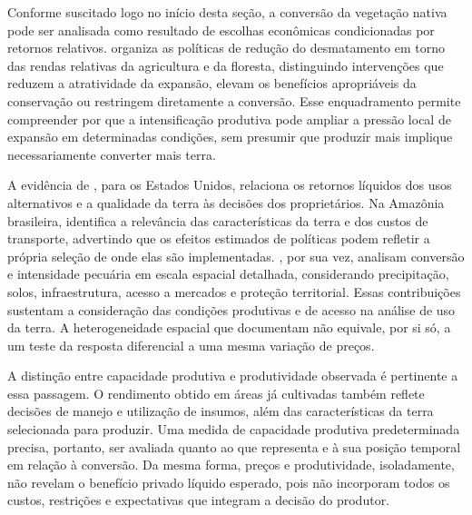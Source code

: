 Conforme suscitado logo no início desta seção, a conversão da vegetação nativa pode ser analisada como resultado de escolhas econômicas condicionadas por retornos relativos.  organiza as políticas de redução do desmatamento em torno das rendas relativas da agricultura e da floresta, distinguindo intervenções que reduzem a atratividade da expansão, elevam os benefícios apropriáveis da conservação ou restringem diretamente a conversão. Esse enquadramento permite compreender por que a intensificação produtiva pode ampliar a pressão local de expansão em determinadas condições, sem presumir que produzir mais implique necessariamente converter mais terra.

A evidência de , para os Estados Unidos, relaciona os retornos líquidos dos usos alternativos e a qualidade da terra às decisões dos proprietários. Na Amazônia brasileira,  identifica a relevância das características da terra e dos custos de transporte, advertindo que os efeitos estimados de políticas podem refletir a própria seleção de onde elas são implementadas. , por sua vez, analisam conversão e intensidade pecuária em escala espacial detalhada, considerando precipitação, solos, infraestrutura, acesso a mercados e proteção territorial. Essas contribuições sustentam a consideração das condições produtivas e de acesso na análise de uso da terra. A heterogeneidade espacial que documentam não equivale, por si só, a um teste da resposta diferencial a uma mesma variação de preços.

A distinção entre capacidade produtiva e produtividade observada é pertinente a essa passagem. O rendimento obtido em áreas já cultivadas também reflete decisões de manejo e utilização de insumos, além das características da terra selecionada para produzir. Uma medida de capacidade produtiva predeterminada precisa, portanto, ser avaliada quanto ao que representa e à sua posição temporal em relação à conversão. Da mesma forma, preços e produtividade, isoladamente, não revelam o benefício privado líquido esperado, pois não incorporam todos os custos, restrições e expectativas que integram a decisão do produtor.

